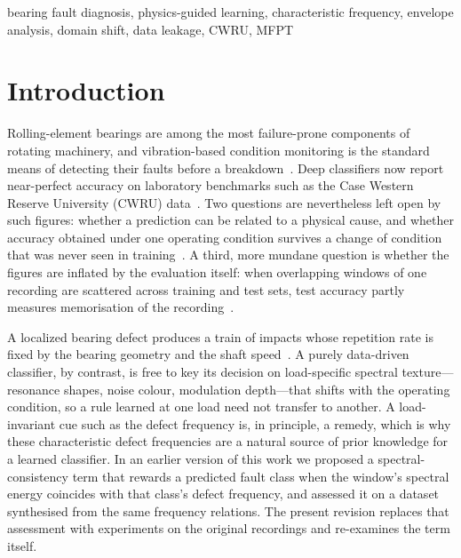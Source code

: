 \documentclass[conference]{IEEEtran}
\begin{document}
\begin{IEEEkeywords}
bearing fault diagnosis, physics-guided learning, characteristic frequency,
envelope analysis, domain shift, data leakage, CWRU, MFPT
\end{IEEEkeywords}

\section{Introduction}
Rolling-element bearings are among the most failure-prone components of
rotating machinery, and vibration-based condition monitoring is the standard
means of detecting their faults before a breakdown~\cite{jardine2006}. Deep
classifiers now report near-perfect accuracy on laboratory benchmarks such as
the Case Western Reserve University (CWRU) data~\cite{zhang2017,wen2018,hoang2019}.
Two questions are nevertheless left open by such figures: whether a
prediction can be related to a physical cause, and whether accuracy obtained
under one operating condition survives a change of condition that was never
seen in training~\cite{lei2020}. A third, more mundane question is whether the
figures are inflated by the evaluation itself: when overlapping windows of one
recording are scattered across training and test sets, test accuracy partly
measures memorisation of the recording~\cite{smith2015,zhao2020}.

A localized bearing defect produces a train of impacts whose repetition rate is
fixed by the bearing geometry and the shaft speed~\cite{mcfadden1984,randall2011}.
A purely data-driven classifier, by contrast, is free to key its decision on
load-specific spectral texture---resonance shapes, noise colour, modulation
depth---that shifts with the operating condition, so a rule learned at one load
need not transfer to another. A load-invariant cue such as the defect frequency
is, in principle, a remedy, which is why
these characteristic defect frequencies are a natural source of prior knowledge
for a learned classifier. In an earlier version of this work we proposed a
spectral-consistency term that rewards a predicted fault class when the
window's spectral energy coincides with that class's defect frequency, and
assessed it on a dataset synthesised from the same frequency relations. The
present revision replaces that assessment with experiments on the original
recordings and re-examines the term itself.
\end{document}
